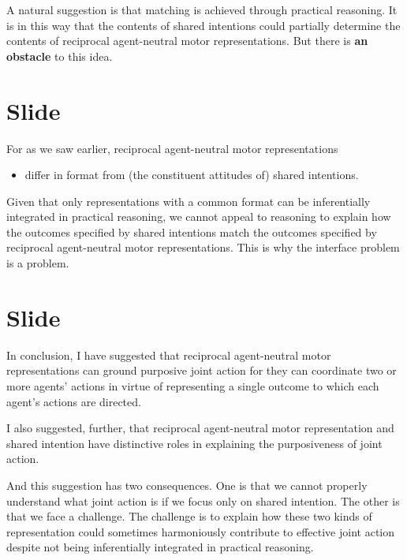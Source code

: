 \documentclass[12pt,\papersize]{extarticle}
\begin{document}
A natural suggestion is that matching is achieved through practical reasoning.
It is in this way that the contents of shared intentions could partially determine the contents of reciprocal agent-neutral motor representations.
But there is \textbf{an obstacle} to this idea.


\section{Slide}
For as we saw earlier, reciprocal agent-neutral motor representations
\begin{itemize}
\item differ in format from (the constituent attitudes of) shared intentions.
\end{itemize}

Given that only representations with a common format can be inferentially integrated in practical reasoning,
we cannot appeal to reasoning to explain how the outcomes specified by shared intentions match the outcomes specified by reciprocal agent-neutral motor representations.
This is why the interface problem is a problem.


\section{Slide}
In conclusion,
I have suggested that 
reciprocal agent-neutral motor representations
can 
ground purposive joint action
for they
can coordinate two or more agents' actions in virtue of representing a single outcome to which each agent's actions are directed.

I also suggested, further, that
reciprocal agent-neutral motor representation
and
shared intention  
have distinctive roles in explaining the purposiveness of joint action.

And this suggestion has two consequences.
One is that we cannot properly understand what joint action is if we focus only on shared intention.
The other is that we face a challenge.
The challenge is to explain how these two kinds of representation could sometimes harmoniously contribute to effective joint action despite not being inferentially integrated in practical reasoning.



\end{document}
